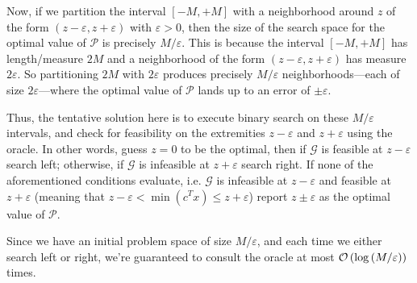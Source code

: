 \documentclass{article}
\begin{document}
\begin{enumerate}[leftmargin={*}, font={\bf}, label={\arabic*.}, ref={\arabic*}]
    Now, if we partition the interval $[-M, +M]$ with a neighborhood around $z$ of the form
    $(z-\varepsilon, z+\varepsilon)$ with $\varepsilon > 0$, then the size of the search
    space for the optimal value of $\mathcal{P}$ is precisely $M/\varepsilon$. This is
    because the interval $[-M, +M]$ has length/measure $2M$ and a neighborhood of the form
    $(z-\varepsilon, z+\varepsilon)$ has measure $2\varepsilon$. So partitioning $2M$ with
    $2\varepsilon$ produces precisely $M/\varepsilon$ neighborhoods---each of size
    $2\varepsilon$---where the optimal value of $\mathcal{P}$ lands up to an error of $\pm
    \varepsilon$.

    Thus, the tentative solution here is to execute binary search on these $M/\varepsilon$
    intervals, and check for feasibility on the extremities $z-\varepsilon$ and $z+\varepsilon$
    using the oracle. In other words, guess $z = 0$ to be the optimal, then if $\mathcal{G}$
    is feasible at $z-\varepsilon$ search left; otherwise, if $\mathcal{G}$ is infeasible at
    $z+\varepsilon$ search right. If none of the aforementioned conditions evaluate, i.e.
    $\mathcal{G}$ is infeasible at $z-\varepsilon$ and feasible at $z+\varepsilon$ (meaning
    that $z-\varepsilon < \min(c^Tx) \leq z+\varepsilon$) report $z\pm\varepsilon$ as the
    optimal value of $\mathcal{P}$.

    Since we have an initial problem space of size $M/\varepsilon$, and each time we either
    search left or right, we're guaranteed to consult the oracle at most
    $\operatorname*{\mathcal{O}}\left(\log\left(M/\varepsilon\right)\right)$ times.
\end{enumerate}
\end{document}
